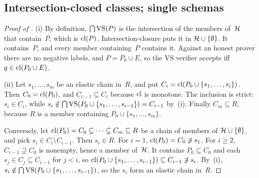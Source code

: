 \subsection{Intersection-closed classes; single schemas}\label{app:caution:closure}

\begin{proof}[Proof of ]
(i) By definition, $\bigcap\mathrm{VS}(P)$ is the intersection of the members of~$\mathcal{H}$ that contain~$P$, which is $\mathrm{cl}(P)$. Intersection-closure puts it in $\mathcal{H}\cup\{\emptyset\}$. It contains~$P$, and every member containing~$P$ contains it. Against an honest prover there are no negative labels, and $P=P_0\cup E$, so the VS verifier accepts iff $q\in\mathrm{cl}(P_0\cup E)$.

(ii) Let $s_1,\dots,s_m$ be an elastic chain in~$R$, and put $C_i=\mathrm{cl}(P_0\cup\{s_1,\dots,s_i\})$. Then $C_0=\mathrm{cl}(P_0)$, and $C_{i-1}\subseteq C_i$ because $\mathrm{cl}$ is monotone. The inclusion is strict: $s_i\in C_i$, while $s_i\notin\bigcap\mathrm{VS}(P_0\cup\{s_1,\dots,s_{i-1}\})=C_{i-1}$ by~(i). Finally $C_m\subseteq R$, because $R$ is a member containing $P_0\cup\{s_1,\dots,s_m\}$.

Conversely, let $\mathrm{cl}(P_0)=C_0\subsetneq\dots\subsetneq C_m\subseteq R$ be a chain of members of $\mathcal{H}\cup\{\emptyset\}$, and pick $s_i\in C_i\setminus C_{i-1}$. Then $s_i\in R$. For $i=1$, $\mathrm{cl}(P_0)=C_0\not\ni s_1$. For $i\ge2$, $C_{i-1}\supsetneq C_0$ is nonempty, hence a member of~$\mathcal{H}$. It contains $P_0\subseteq C_0$ and each $s_j\in C_j\subseteq C_{i-1}$ for $j<i$, so $\mathrm{cl}(P_0\cup\{s_1,\dots,s_{i-1}\})\subseteq C_{i-1}\not\ni s_i$. By~(i), $s_i\notin\bigcap\mathrm{VS}(P_0\cup\{s_1,\dots,s_{i-1}\})$, so the $s_i$ form an elastic chain in~$R$.
\end{proof}

